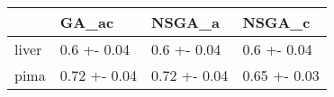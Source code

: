 \begin{tabular}{llll}
\toprule
{} &         GA\_ac &        NSGA\_a &        NSGA\_c \\
\midrule
liver &   0.6 +- 0.04 &   0.6 +- 0.04 &   0.6 +- 0.04 \\
pima  &  0.72 +- 0.04 &  0.72 +- 0.04 &  0.65 +- 0.03 \\
\bottomrule
\end{tabular}
